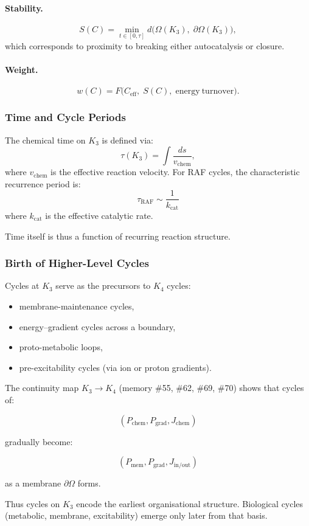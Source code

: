 \paragraph{Stability.}
\[
  S(C) = \min_{t\in[0,\tau]}
         d\bigl(
           \Omega(K_3),\;
           \partial\Omega(K_3)
         \bigr),
\]
which corresponds to proximity to breaking either autocatalysis or
closure.

\paragraph{Weight.}
\[
  w(C) = F\bigl(
           C_{\mathrm{eff}},\;
           S(C),\;
           \mathrm{energy\ turnover}
         \bigr).
\]

\subsubsection{Time and Cycle Periods}

The chemical time on $K_3$ is defined via:
\[
  \tau(K_3) = \int \frac{ds}{v_{\mathrm{chem}}},
\]
where $v_{\mathrm{chem}}$ is the effective reaction velocity.
For RAF cycles, the characteristic recurrence period is:
\[
  \tau_{\mathrm{RAF}}
  \sim \frac{1}{k_{\mathrm{cat}}}
\]
where $k_{\mathrm{cat}}$ is the effective catalytic rate.

Time itself is thus a function of recurring reaction structure.

\subsubsection{Birth of Higher-Level Cycles}

Cycles at $K_3$ serve as the precursors to $K_4$ cycles:

\begin{itemize}
  \item membrane-maintenance cycles,
  \item energy–gradient cycles across a boundary,
  \item proto-metabolic loops,
  \item pre-excitability cycles (via ion or proton gradients).
\end{itemize}

The continuity map $K_3\to K_4$ (memory \#55, \#62, \#69, \#70)
shows that cycles of:

\[
  (P_{\mathrm{chem}}, P_{\mathrm{grad}}, J_{\mathrm{chem}})
\]

gradually become:

\[
  (P_{\mathrm{mem}}, P_{\mathrm{grad}}, J_{\mathrm{in/out}})
\]

as a membrane $\partial\Omega$ forms.

Thus cycles on $K_3$ encode the earliest organisational structure.
Biological cycles (metabolic, membrane, excitability) emerge only later
from that basis.


